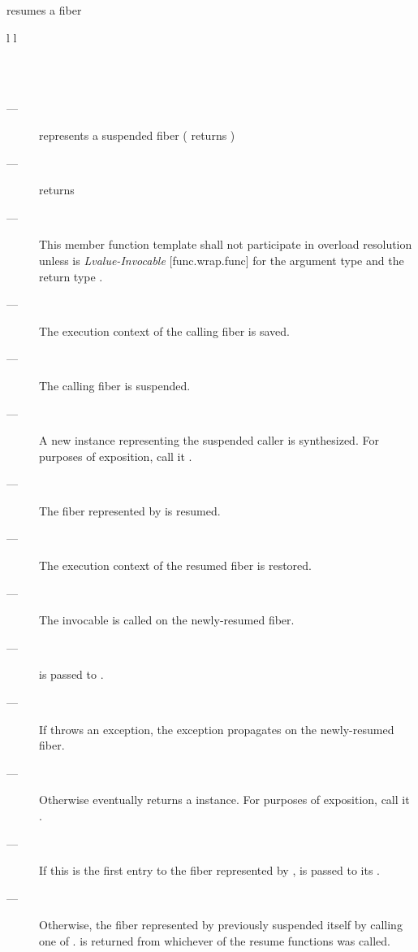 resumes a fiber

\begin{tabular}{ l l }
    \midrule

    \\
    \\

    \midrule
\end{tabular}

\requires
\begin{description}
    \item[---]  represents a suspended fiber ( returns )
    \item[---] \canxtresume returns 
\end{description}

\effects
\begin{description}
    \item[---] This member function template shall not participate in overload
               resolution unless  is \emph{Lvalue-Invocable} [func.wrap.func]
               for the argument type  and the return
               type \fiber.\\
    \item[---] The execution context of the calling fiber is saved.
    \item[---] The calling fiber is suspended.
    \item[---] A new \fiber instance representing the suspended caller is
               synthesized. For purposes of exposition, call it .
    \item[---] The fiber represented by  is resumed.
    \item[---] The execution context of the resumed fiber is restored.
    \item[---] The invocable  is called on the newly-resumed fiber.
    \item[---]  is passed to .
    \item[---] If  throws an exception, the exception propagates on
               the newly-resumed fiber.
    \item[---] Otherwise  eventually returns a \fiber instance. For
               purposes of exposition, call it .
    \item[---] If this is the first entry to the fiber represented
               by ,  is passed to its \entryfn.
    \item[---] Otherwise, the fiber represented by  previously
               suspended itself by calling one of \allresume. 
               is returned from whichever of the resume functions was
               called.
\end{description}

